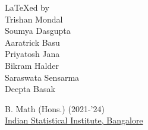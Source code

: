 \documentclass[../Analysis-3.tex]{subfiles}
\begin{document}

\newpage
\thispagestyle{plain}

\phantom{.}

\vfill

\sffamily
{\LARGE {\rm\LaTeX}ed by} \\[0.5cm]

\large
Trishan Mondal \\
Soumya Dasgupta \\
Aaratrick Basu \\
Priyatosh Jana \\
Bikram Halder \\
Saraswata Sensarma \\
Deepta Basak

\vspace{0.5cm}

B. Math (Hons.) (2021-'24) \\
\href{https://www.isibang.ac.in}{Indian Statistical Institute, Bangalore}
\end{document}
